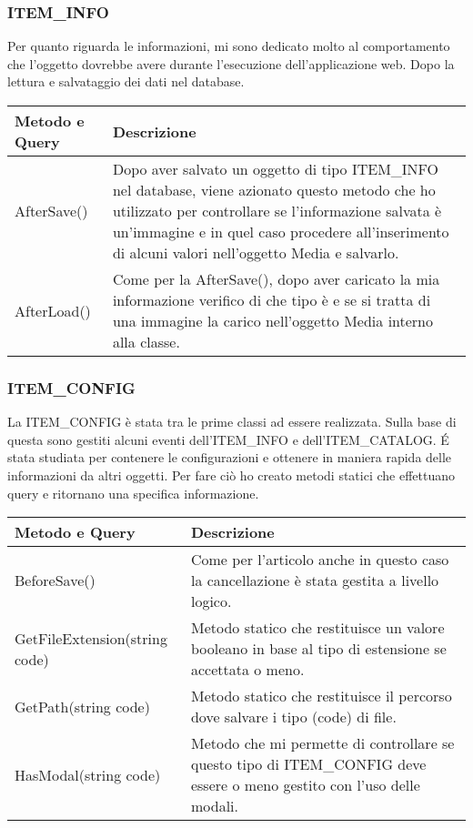 \subsubsection{ITEM\_INFO}
Per quanto riguarda le informazioni, mi sono dedicato molto al comportamento che l'oggetto dovrebbe avere durante l'esecuzione dell'applicazione web. Dopo la lettura e salvataggio dei dati nel database. 
\begin{center}
	\begin{tabular}{ p{3cm}|p{} }
		\hline
		\textbf{Metodo e Query} & \textbf{Descrizione}\\
		\hline
		AfterSave() & Dopo aver salvato un oggetto di tipo ITEM\_INFO nel database, viene azionato questo metodo che ho utilizzato per controllare se l'informazione salvata è un'immagine e in quel caso procedere all'inserimento di alcuni valori nell'oggetto Media e salvarlo.\\
		\hline
		AfterLoad() & Come per la AfterSave(), dopo aver caricato la mia informazione verifico di che tipo è e se si tratta di una immagine la carico nell'oggetto Media interno alla classe.\\
		
	\end{tabular}
\end{center}

\subsubsection{ITEM\_CONFIG}
La ITEM\_CONFIG è stata tra le prime classi ad essere realizzata. Sulla base di questa sono gestiti alcuni eventi dell'ITEM\_INFO e dell'ITEM\_CATALOG. \'E stata studiata per contenere le configurazioni e ottenere in maniera rapida delle informazioni da altri oggetti. Per fare ciò ho creato metodi statici che effettuano query e ritornano una specifica informazione.
\begin{center}
	\begin{tabular}{ p{3cm}|p{} }
		\hline
		\textbf{Metodo e Query} & \textbf{Descrizione}\\
		\hline
		BeforeSave()		& Come per l'articolo anche in questo caso la cancellazione è stata gestita a livello logico.\\
		\hline
		GetFileExtension(string code)	& Metodo statico che restituisce un valore booleano in base al tipo di estensione se accettata o meno.\\
		\hline
		GetPath(string code) & Metodo statico che restituisce il percorso dove salvare i tipo (code) di file.\\
		\hline
		HasModal(string code) & Metodo che mi permette di controllare se questo tipo di ITEM\_CONFIG deve essere o meno gestito con l'uso delle modali.\\

	\end{tabular}
\end{center}


